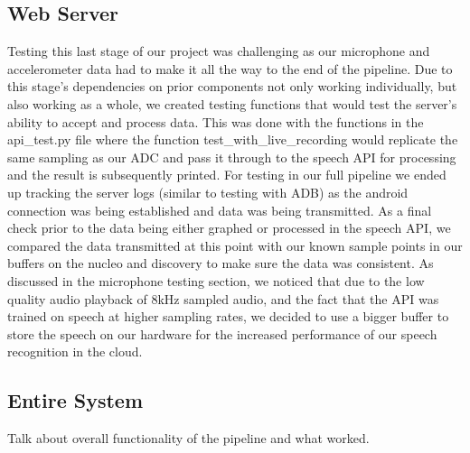 \subsection{Web Server}
Testing this last stage of our project was challenging as our microphone and accelerometer data had to make it all the way to the end of the pipeline. Due to this stage's dependencies on prior components not only working individually, but also working as a whole, we created testing functions that would test the server's ability to accept and process data. This was done with the functions in the api\_test.py file where the function 
test\_with\_live\_recording would replicate the same sampling as our ADC and pass it through to the speech API for processing and the result is subsequently printed. For testing in our full pipeline we ended up tracking the server logs (similar to testing with ADB) as the android connection was being established and data was being transmitted. As a final check prior to the data being either graphed or processed in the speech API, we compared the data transmitted at this point with our known sample points in our buffers on the nucleo and discovery to make sure the data was consistent. As discussed in the microphone testing section, we noticed that due to the low quality audio playback of 8kHz sampled audio, and the fact that the API was trained on speech at higher sampling rates, we decided to use a bigger buffer to store the speech on our hardware for the increased performance of our speech recognition in the cloud.

\subsection{Entire System}
Talk about overall functionality of the pipeline and what worked.